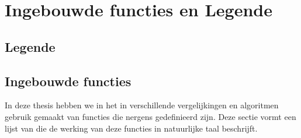 \chapter{Ingebouwde functies en Legende}


\section{Legende}

\section{Ingebouwde functies}

In deze thesis hebben we in het in verschillende vergelijkingen en algoritmen gebruik gemaakt van functies die nergens gedefinieerd zijn. Deze sectie vormt een lijst van die de werking van deze functies in natuurlijke taal beschrijft.